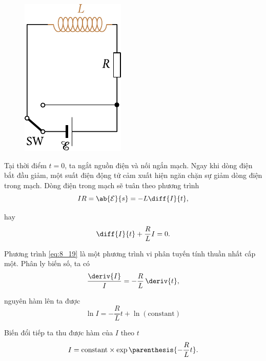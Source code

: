 \begin{figure}[!h]
	\begin{center}
		\includegraphics[scale=1]{figures/ch_08/fig_8_7.pdf}
		\caption[]{}
		\label{fig:8_7}
	\end{center}
	\vspace{-0.8cm}
\end{figure}

Tại thời điểm $t=0$, ta ngắt nguồn điện và nối ngắn mạch.
Ngay khi dòng điện bắt đầu giảm, một suất điện động tử cảm xuất hiện ngăn chặn sự giảm dòng điện trong mạch.
Dòng điện trong mạch sẽ tuân theo phương trình
\begin{equation*}
	IR = \ab{\mathcal{E}}{s} = - L \diff{I}{t},
\end{equation*}

\noindent
hay
\begin{equation}\label{eq:8_19}
	\diff{I}{t} + \frac{R}{L} I = 0.
\end{equation}

\noindent
Phương trình \eqref{eq:8_19} là một phương trình vi phân tuyến tính thuần nhất cấp một.
Phân ly biến số, ta có
\begin{equation*}
	\frac{\deriv{I}}{I} = - \frac{R}{L}\, \deriv{t},
\end{equation*}

\noindent
nguyên hàm lên ta được
\begin{equation*}
	\ln{I} = - \frac{R}{L} t + \ln(\text{constant})
\end{equation*}

\noindent
Biến đổi tiếp ta thu được hàm của $I$ theo $t$
\begin{equation}\label{eq:8_20}
	I = \text{constant} \times \exp\parenthesis{- \frac{R}{L} t}.
\end{equation}

